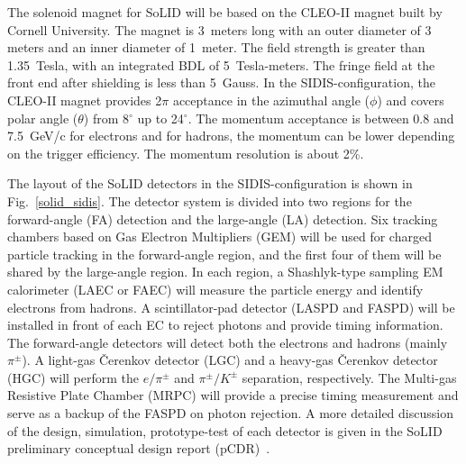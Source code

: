 The solenoid magnet for SoLID will be based on the CLEO-II magnet built by
Cornell University. The magnet is 3~meters long with an outer diameter of 3
meters and an inner diameter of 1~meter. The field strength is greater than
1.35~Tesla, with an integrated BDL of 5~Tesla-meters. The fringe field at the
front end after shielding is less than 5~Gauss. In the SIDIS-configuration, the
CLEO-II magnet provides 2$\pi$ acceptance in the azimuthal angle ($\phi$) and
covers polar angle ($\theta$) from 8$^{\circ}$ up to 24$^{\circ}$. The
momentum acceptance is between 0.8 and 7.5~GeV/c for electrons and for hadrons,
the momentum can be lower depending on the trigger efficiency.  The momentum
resolution is about 2\%.

The layout of the SoLID detectors in the SIDIS-configuration is shown in
Fig.~\ref{solid_sidis}. The detector system is divided into two regions for the
forward-angle (FA) detection and the large-angle (LA) detection. Six tracking
chambers based on Gas Electron Multipliers (GEM) will be used for charged
particle tracking in the forward-angle region, and the first four of them will
be shared by the large-angle
region. In each region, a Shashlyk-type sampling EM calorimeter (LAEC or
FAEC) will measure the particle energy and identify electrons from hadrons. A
scintillator-pad detector (LASPD and FASPD) will be installed in front of each
EC to reject photons and provide timing information. The forward-angle
detectors will detect both the electrons and hadrons (mainly $\pi^{\pm}$). A
light-gas \v{C}erenkov detector (LGC) and a heavy-gas \v{C}erenkov detector
(HGC) will perform the $e/\pi^{\pm}$ and $\pi^{\pm}/K^{\pm}$ separation,
respectively. The Multi-gas Resistive Plate Chamber (MRPC) will provide a
precise timing measurement and serve as a backup of the FASPD on photon
rejection. A more detailed discussion of the design, simulation, prototype-test
of each detector is given in the SoLID preliminary conceptual design report
(pCDR)~\cite{solid_pcdr}.

